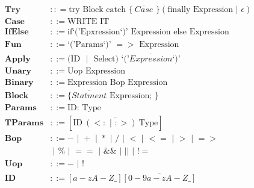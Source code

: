 \documentclass[12pt]{article}
\newcommand\bnf{\,\,|\,\,}
\renewcommand\c[1]{\text{#1}}
\begin{document}
\begin{align*}
  \textbf{Try} & :: = \c{try Block catch \{}~\overline{Case} \c{ \} }
      (\c{finally Expression} \bnf \epsilon) \\
  \textbf{Case} & ::= \c{WRITE IT} \\
  \textbf{IfElse} & ::= \c{if`('Epxression`)' Expression else Expression} \\
  \textbf{Fun} & ::= \c{`('Params`)' $=>$ Expression} \\
  \textbf{Apply} & ::= \c{(ID $\bnf$ Select) `('$\overline{Expression}$`)'} \\
  \textbf{Unary} & ::= \c{Uop Expression} \\
  \textbf{Binary} & ::= \c{Expression Bop Expression} \\
  \textbf{Block} & ::= \c{\{ $\overline{Statment}$ Expression; \}} \\
  \textbf{Params} & ::= \c{ID: Type} \\
  \textbf{TParams} & ::= [\overline{\c{ID}~(<: \bnf :>)~\c{Type}}] \\
  \textbf{Bop} & ::= - \bnf + \bnf * \bnf / \bnf < \bnf <= \bnf > \bnf => \\
      & \bnf \% \bnf == \bnf \&\& \bnf \texttt{||} \bnf != \\
  \textbf{Uop} & ::= - \bnf ! \\
  \textbf{ID} & ::= [a-zA-Z\_]\overline{[0-9a-zA-Z\_]} \\
\end{align*}
\end{document}
